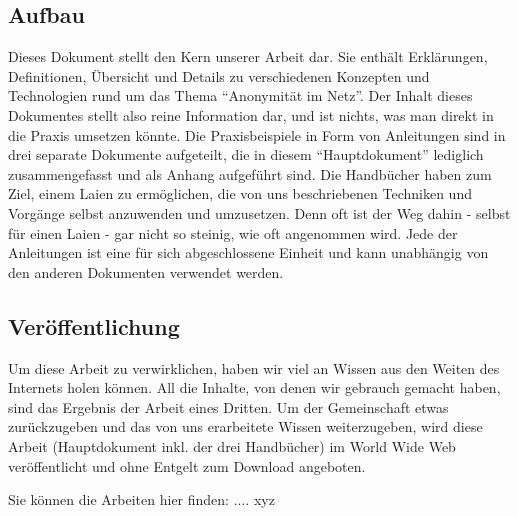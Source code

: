 \subsection{Aufbau}
Dieses Dokument stellt den Kern unserer Arbeit dar. Sie enthält Erklärungen, Definitionen, Übersicht und Details zu verschiedenen Konzepten und Technologien rund um das Thema ``Anonymität im Netz''. Der Inhalt dieses Dokumentes stellt also reine Information dar, und ist nichts, was man direkt in die Praxis umsetzen könnte. Die Praxisbeispiele in Form von Anleitungen sind in drei separate Dokumente aufgeteilt, die in diesem ``Hauptdokument'' lediglich zusammengefasst und als Anhang aufgeführt sind. Die Handbücher haben zum Ziel, einem Laien zu ermöglichen, die von uns beschriebenen Techniken und Vorgänge selbst anzuwenden und umzusetzen. Denn oft ist der Weg dahin - selbst für einen Laien - gar nicht so steinig, wie oft angenommen wird. Jede der Anleitungen ist eine für sich abgeschlossene Einheit und kann unabhängig von den anderen Dokumenten verwendet werden.

\subsection{Veröffentlichung}
Um diese Arbeit zu verwirklichen, haben wir viel an Wissen aus den Weiten des Internets holen können. All die Inhalte, von denen wir gebrauch gemacht haben, sind das Ergebnis der Arbeit eines Dritten. Um der Gemeinschaft etwas zurückzugeben und das von uns erarbeitete Wissen weiterzugeben, wird diese Arbeit (Hauptdokument inkl. der drei Handbücher) im World Wide Web veröffentlicht und ohne Entgelt zum Download angeboten.

Sie können die Arbeiten hier finden: .... xyz
